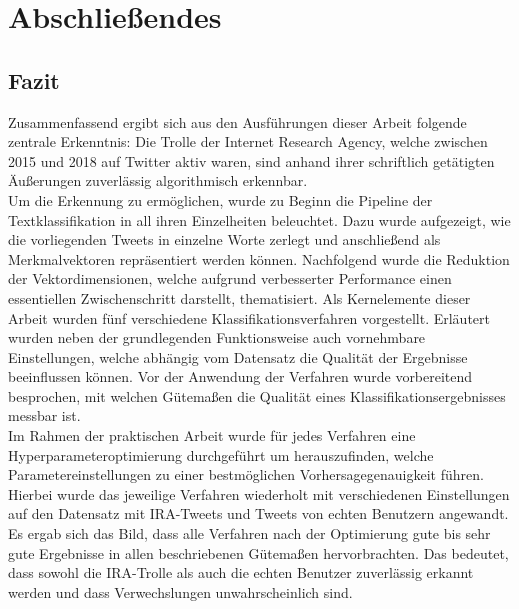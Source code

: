 \section{Abschließendes}\raggedbottom
\subsection{Fazit}
Zusammenfassend ergibt sich aus den Ausführungen dieser Arbeit folgende zentrale Erkenntnis: Die Trolle der Internet Research Agency, welche zwischen 2015 und 2018 auf Twitter aktiv waren, sind anhand ihrer schriftlich getätigten Äußerungen zuverlässig algorithmisch erkennbar.\\
Um die Erkennung zu ermöglichen, wurde zu Beginn die Pipeline der Textklassifikation in all ihren Einzelheiten beleuchtet. Dazu wurde aufgezeigt, wie die vorliegenden Tweets in einzelne Worte zerlegt und anschließend als Merkmalvektoren repräsentiert werden können. Nachfolgend wurde die Reduktion der Vektordimensionen, welche aufgrund verbesserter Performance einen essentiellen Zwischenschritt darstellt, thematisiert. Als Kernelemente dieser Arbeit wurden fünf verschiedene Klassifikationsverfahren vorgestellt. Erläutert wurden neben der grundlegenden Funktionsweise auch vornehmbare Einstellungen, welche abhängig vom Datensatz die Qualität der Ergebnisse beeinflussen können. Vor der Anwendung der Verfahren wurde vorbereitend besprochen, mit welchen Gütemaßen die Qualität eines Klassifikationsergebnisses messbar ist.\\
Im Rahmen der praktischen Arbeit wurde für jedes Verfahren eine Hyperparameteroptimierung durchgeführt um herauszufinden, welche Parametereinstellungen zu einer bestmöglichen Vorhersagegenauigkeit führen. Hierbei wurde das jeweilige Verfahren wiederholt mit verschiedenen Einstellungen auf den Datensatz mit IRA-Tweets und Tweets von echten Benutzern angewandt. Es ergab sich das Bild, dass alle Verfahren nach der Optimierung gute bis sehr gute Ergebnisse in allen beschriebenen Gütemaßen hervorbrachten. Das bedeutet, dass sowohl die IRA-Trolle als auch die echten Benutzer zuverlässig erkannt werden und dass Verwechslungen unwahrscheinlich sind.
